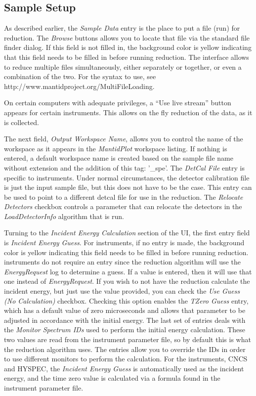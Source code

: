 \subsection{Sample Setup}
As described earlier, the \textit{Sample Data} entry is the place to put a file (run) for reduction. The \textit{Browse} buttons allows you to locate that file via the standard file finder dialog. If this field is not filled in, the background color is yellow indicating that this field needs to be filled in before running reduction. The interface allows to reduce multiple files simultaneously, either separately or together, or even a combination of the two. For the syntax to use, see http://www.mantidproject.org/MultiFileLoading.

On certain computers with adequate privileges, a ``Use live stream'' button appears for certain instruments. This allows on the fly reduction of the data, as it is collected.

The next field, \textit{Output Workspace Name}, allows you to control the name of the workspace as it appears in the \textit{MantidPlot} workspace listing. If nothing is entered, a default workspace name is created based on the sample file name without extension and the addition of this tag: '\_spe'. The \textit{DetCal File} entry is specific to \isis{} instruments. Under normal circumstances, the detector calibration file is just the input sample file, but this does not have to be the case. This entry can be used to point to a different detcal file for use in the reduction. The \textit{Relocate Detectors} checkbox controls a parameter that can relocate the detectors in the \textit{LoadDetectorInfo} \mantid{} algorithm that is run. 

Turning to the \textit{Incident Energy Calculation} section of the UI, the first entry field is \textit{Incident Energy Guess}. For \isis{} instruments, if no entry is made, the background color is yellow indicating this field needs to be filled in before running reduction. \sns{} instruments do not require an entry since the reduction algorithm will use the \textit{EnergyRequest} log to determine a guess. If a value is entered, then it will use that one instead of \textit{EnergyRequest}. If you wish to not have the reduction calculate the incident energy, but just use the value provided, you can check the \textit{Use Guess (No Calculation)} checkbox. Checking this option enables the \textit{TZero Guess} entry, which has a default value of zero microseconds and allows that parameter to be adjusted in accordance with the initial energy. The last set of entries deals with the \textit{Monitor Spectrum IDs} used to perform the initial energy calculation. These two values are read from the instrument parameter file, so by default this is what the reduction algorithm uses. The entries allow you to override the IDs in order to use different monitors to perform the calculation. For the \sns{} instruments, CNCS and HYSPEC, the \textit{Incident Energy Guess} is automatically used as the incident energy, and the time zero value is calculated via a formula found in the instrument parameter file.

